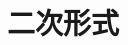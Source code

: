 \documentclass[../../topic_linear-algebra]{subfiles}
\begin{document}
\chapter{二次形式}
\end{document}

